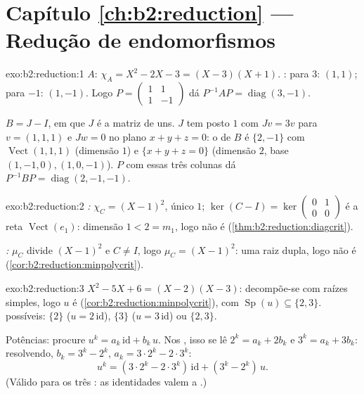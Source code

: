 \section*{Capítulo \ref{ch:b2:reduction} --- Redução de endomorfismos}

\begin{solution}{exo:b2:reduction:1}
$A$: $\chi_A = X^2 - 2X - 3 = (X - 3)(X + 1)$. : para
$3$: $(1,1)$; para $-1$: $(1,-1)$. Logo $P = \begin{pmatrix} 1 & 1\\ 1
& -1\end{pmatrix}$ dá $P^{-1}AP = \operatorname{diag}(3, -1)$.

$B = J - I$, em que $J$ é a matriz de uns. $J$ tem posto $1$ com
$Jv = 3v$ para $v = (1,1,1)$ e $Jw = 0$ no plano $x + y + z =
0$: o  de $B$ é $\{2, -1\}$ com 
$\operatorname{Vect}(1,1,1)$ (dimensão $1$) e $\{x + y + z = 0\}$
(dimensão $2$, base $(1,-1,0), (1,0,-1)$). $P$ com essas três
colunas dá $P^{-1}BP = \operatorname{diag}(2, -1, -1)$.
\end{solution}

\begin{solution}{exo:b2:reduction:2}
\emph{:} $\chi_C = (X-1)^2$, único  $1$;
$\ker(C - I) = \ker\begin{pmatrix} 0&1\\ 0&0\end{pmatrix}$ é a
reta $\operatorname{Vect}(e_1)$: dimensão $1 < 2 = m_1$, logo não é
 (\cref{thm:b2:reduction:diagcrit}).

\emph{:} $\mu_C$ divide $(X-1)^2$ e $C \neq I$,
logo $\mu_C = (X-1)^2$: uma raiz dupla, logo não é 
(\cref{cor:b2:reduction:minpolycrit}).
\end{solution}

\begin{solution}{exo:b2:reduction:3}
$X^2 - 5X + 6 = (X-2)(X-3)$: decompõe-se com raízes simples, logo $u$ é
 (\cref{cor:b2:reduction:minpolycrit}), com
$\operatorname{Sp}(u) \subseteq \{2, 3\}$.  possíveis:
$\{2\}$ ($u = 2\,\mathrm{id}$), $\{3\}$ ($u = 3\,\mathrm{id}$) ou
$\{2, 3\}$.

Potências: procure $u^k = a_k\,\mathrm{id} + b_k\,u$. Nos ,
isso se lê $2^k = a_k + 2b_k$ e $3^k = a_k + 3b_k$: resolvendo, $b_k
= 3^k - 2^k$, $a_k = 3\cdot2^k - 2\cdot 3^k$:
\[
u^k = (3\cdot 2^k - 2\cdot 3^k)\,\mathrm{id} + (3^k - 2^k)\, u .
\]
(Válido para os três : as identidades valem  a .)
\end{solution}

